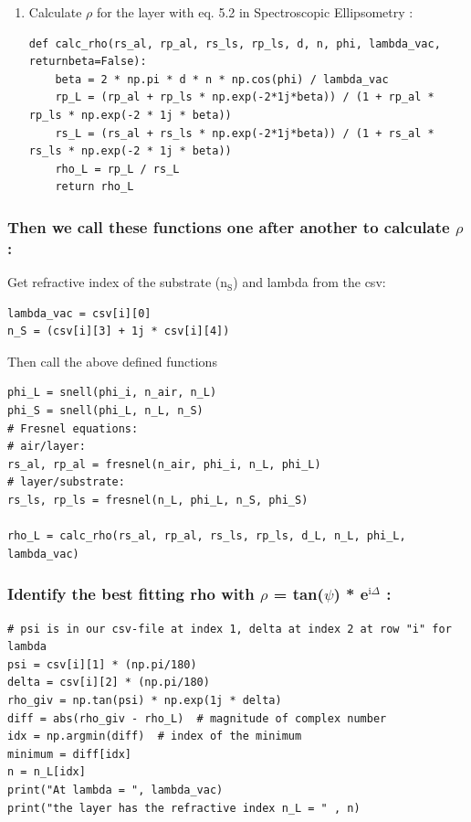 \documentclass[11pt]{article}
\begin{document}
\begin{enumerate}
\item Calculate \(\rho\) for the layer with eq. 5.2 in Spectroscopic Ellipsometry :
\label{sec:org0914871}
\begin{verbatim}
def calc_rho(rs_al, rp_al, rs_ls, rp_ls, d, n, phi, lambda_vac, returnbeta=False):
    beta = 2 * np.pi * d * n * np.cos(phi) / lambda_vac
    rp_L = (rp_al + rp_ls * np.exp(-2*1j*beta)) / (1 + rp_al * rp_ls * np.exp(-2 * 1j * beta))
    rs_L = (rs_al + rs_ls * np.exp(-2*1j*beta)) / (1 + rs_al * rs_ls * np.exp(-2 * 1j * beta))
    rho_L = rp_L / rs_L
    return rho_L
\end{verbatim}
\end{enumerate}


\subsubsection{Then we call these functions one after another to calculate \(\rho\):}
\label{sec:org1a6b621}
Get refractive index of the substrate (n\(_{\text{S}}\)) and lambda from the csv:
\begin{verbatim}
lambda_vac = csv[i][0]
n_S = (csv[i][3] + 1j * csv[i][4])
\end{verbatim}

Then call the above defined functions
\begin{verbatim}
phi_L = snell(phi_i, n_air, n_L)
phi_S = snell(phi_L, n_L, n_S)
# Fresnel equations:
# air/layer:
rs_al, rp_al = fresnel(n_air, phi_i, n_L, phi_L)
# layer/substrate:
rs_ls, rp_ls = fresnel(n_L, phi_L, n_S, phi_S)

rho_L = calc_rho(rs_al, rp_al, rs_ls, rp_ls, d_L, n_L, phi_L, lambda_vac)
\end{verbatim}


\subsubsection{Identify the best fitting rho with \(\rho\) = tan(\(\psi\)) * e\(^{\text{i}\Delta}\) :}
\label{sec:org4d0a82d}

\begin{verbatim}
# psi is in our csv-file at index 1, delta at index 2 at row "i" for lambda
psi = csv[i][1] * (np.pi/180)
delta = csv[i][2] * (np.pi/180)
rho_giv = np.tan(psi) * np.exp(1j * delta)
diff = abs(rho_giv - rho_L)  # magnitude of complex number
idx = np.argmin(diff)  # index of the minimum
minimum = diff[idx]
n = n_L[idx]
print("At lambda = ", lambda_vac)
print("the layer has the refractive index n_L = " , n)
\end{verbatim}
\end{document}
